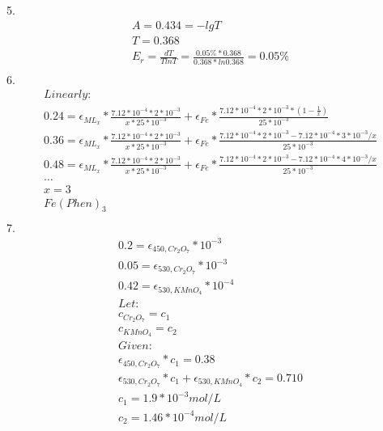 \documentclass{article}
\begin{document}
5.\begin{equation}
    \begin{multlined}
        A = 0.434 = -lgT\\
        T = 0.368\\
        E_r = \frac{dT}{TlnT} = \frac{0.05\%*0.368}{0.368*ln0.368} = 0.05\%\\
    \end{multlined}
\end{equation}
6.\begin{equation}
    \begin{multlined}
        Linearly:\\
        0.24 = \epsilon_{ML_x} * \frac{7.12*10^{-4}*2*10^{-3}}{x*25*10^{-3}} + \epsilon_{Fe}*\frac{7.12*10^{-4}*2*10^{-3}*(1 - \frac{1}{x})}{25*10^{-3}}\\
        0.36 = \epsilon_{ML_x} * \frac{7.12*10^{-4}*2*10^{-3}}{x*25*10^{-3}} + \epsilon_{Fe}*\frac{7.12*10^{-4}*2*10^{-3} - 7.12*10^{-4}*3*10^{-3}/x}{25*10^{-3}}\\
        0.48 = \epsilon_{ML_x} * \frac{7.12*10^{-4}*2*10^{-3}}{x*25*10^{-3}} + \epsilon_{Fe}*\frac{7.12*10^{-4}*2*10^{-3} - 7.12*10^{-4}*4*10^{-3}/x}{25*10^{-3}}\\
        \dots\\
        x = 3\\
        Fe(Phen)_3\\
    \end{multlined}
\end{equation}
7.\begin{equation}
    \begin{multlined}
        0.2 = \epsilon_{450,Cr_2O_7}*10^{-3}\\
        0.05 = \epsilon_{530,Cr_2O_7}*10^{-3}\\
        0.42 = \epsilon_{530,KMnO_4}*10^{-4}\\
        Let:\\
        c_{Cr_2O_7} = c_1\\
        c_{KMnO_4} = c_2\\
        Given:\\
        \epsilon_{450,Cr_2O_7}*c_1 = 0.38\\
        \epsilon_{530,Cr_2O_7}*c_1 + \epsilon_{530,KMnO_4}*c_2 = 0.710\\
        c_1 = 1.9*10^{-3} mol/L\\
        c_2 = 1.46*10^{-4} mol/L\\
    \end{multlined}
\end{equation}
\end{document}

